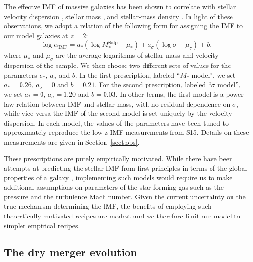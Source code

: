 \documentclass[usenatbib]{mnras}
\def\msalp{M_*^{\mathrm{Salp}}}
\def\aimf{\alpha_{\mathrm{IMF}}}
\def\Sref#1{Section~\ref{#1}\xspace}
\begin{document}
The effectve IMF of massive galaxies has been shown to correlate
with stellar velocity dispersion \citep[e.g.][]{Tre++10, CvD12,
  Cap++12, LaB++13, Spi++14, Pos++15}, stellar mass \citep{Aug++10b, Son++15},
 and stellar-mass density
\citep{Spi++15}.  In light of these observations, we adopt a relation
of the following form for assigning the IMF to our model galaxies at
$z=2$:
\begin{equation}\label{eq:imfform}
\log{\aimf} = a_*(\log{\msalp} - \mu_*) + a_\sigma(\log{\sigma} - \mu_\sigma) + b,
\end{equation}
where $\mu_*$ and $\mu_\sigma$ are the average logarithms of stellar mass and velocity dispersion of the sample.
We then choose two different sets of values for the parameters $a_*$, $a_\sigma$ and $b$. In the first prescription, labeled ``$M_*$ model'', we set $a_*=0.26$, $a_\sigma=0$ and $b=0.21$.
For the second prescription, labeled ``$\sigma$ model'', we set $a_*=0$, $a_\sigma=1.20$ and $b=0.03$.
In other terms, the first model is a power-law relation between IMF and stellar mass, with no residual dependence on $\sigma$, while vice-versa the IMF of the second model is set uniquely by the velocity dispersion.
In each model, the values of the parameters have been tuned to approximately reproduce the low-z IMF measurements from S15. Details on these measurements are given in \Sref{sect:obs}.

These prescriptions are purely empirically motivated. While there have been attempts at predicting the stellar IMF from first principles in terms of the global properties of a galaxy \citep[e.g.][]{Kru11,Hop12}, implementing such models would require us to make additional assumptions on parameters of the star forming gas such as the pressure and the turbulence Mach number.
Given the current uncertainty on the true mechanism determining the IMF, the benefits of employing such theoretically motivated recipes are modest and we therefore limit our model to simpler empirical recipes.


\subsection{The dry merger evolution}
\label{ssec:drymerger}
\end{document}

